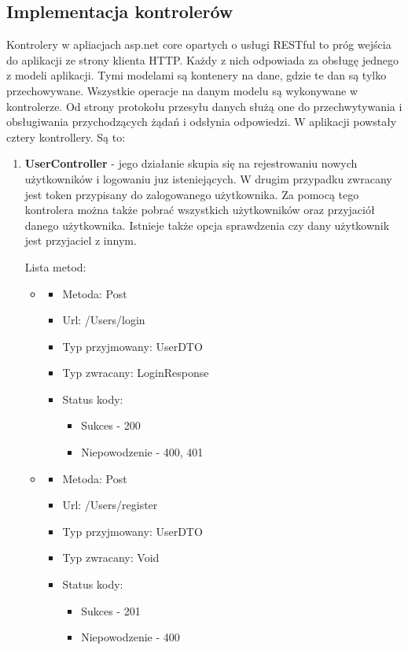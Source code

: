 \documentclass[12pt,a4paper]{article}
\begin{document}
\subsection{Implementacja kontrolerów}		%
\hspace*{0.7cm} Kontrolery w apliacjach asp.net core opartych o usługi RESTful to próg wejścia do aplikacji ze strony klienta HTTP. Każdy z nich odpowiada za obsługę jednego z modeli aplikacji. Tymi modelami są kontenery na dane, gdzie te dan są tylko przechowywane. Wszystkie operacje na danym modelu są wykonywane w kontrolerze. Od strony protokołu przesyłu danych służą one do przechwytywania i obsługiwania przychodzących żądań i odsłynia odpowiedzi. 
\hspace*{0.7cm} W aplikacji powstały cztery kontrollery. Są to:
\begin{enumerate}
	\item \textbf{UserController} - jego działanie skupia się na rejestrowaniu nowych użytkowników i logowaniu juz isteniejących. W drugim przypadku zwracany jest token przypisany do zalogowanego użytkownika. Za pomocą tego kontrolera można także pobrać wszystkich użytkowników oraz przyjaciół danego użytkownika. Istnieje także opcja sprawdzenia czy dany użytkownik jest przyjaciel z innym.
	
	Lista metod:
	\begin{itemize}
		\item 
		\begin{itemize}
			\item Metoda: Post
			\item Url: /Users/login
			\item Typ przyjmowany: UserDTO
			\item Typ zwracany: LoginResponse
			\item Status kody:
				\begin{itemize}
					\item Sukces - 200
					\item Niepowodzenie - 400, 401
				\end{itemize}
		\end{itemize}
	
		\item 
		\begin{itemize}
			\item Metoda: Post
			\item Url: /Users/register
			\item Typ przyjmowany: UserDTO
			\item Typ zwracany: Void
			\item Status kody: 
							\begin{itemize}
				\item Sukces - 201
				\item Niepowodzenie - 400
			\end{itemize}
		\end{itemize}
	

\end{itemize}
\end{enumerate}
\end{document}

